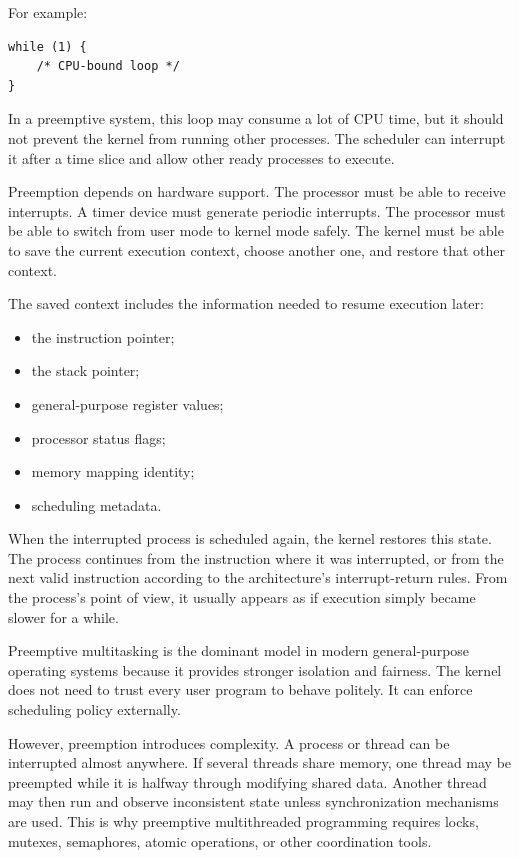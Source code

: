 For example:

\begin{verbatim}
while (1) {
    /* CPU-bound loop */
}
\end{verbatim}

In a preemptive system, this loop may consume a lot of CPU time, but it should not prevent the kernel from running other processes. The scheduler can interrupt it after a time slice and allow other ready processes to execute.

Preemption depends on hardware support. The processor must be able to receive interrupts. A timer device must generate periodic interrupts. The processor must be able to switch from user mode to kernel mode safely. The kernel must be able to save the current execution context, choose another one, and restore that other context.

The saved context includes the information needed to resume execution later:

\begin{itemize}
    \item the instruction pointer;
    \item the stack pointer;
    \item general-purpose register values;
    \item processor status flags;
    \item memory mapping identity;
    \item scheduling metadata.
\end{itemize}

When the interrupted process is scheduled again, the kernel restores this state. The process continues from the instruction where it was interrupted, or from the next valid instruction according to the architecture's interrupt-return rules. From the process's point of view, it usually appears as if execution simply became slower for a while.

Preemptive multitasking is the dominant model in modern general-purpose operating systems because it provides stronger isolation and fairness. The kernel does not need to trust every user program to behave politely. It can enforce scheduling policy externally.

However, preemption introduces complexity. A process or thread can be interrupted almost anywhere. If several threads share memory, one thread may be preempted while it is halfway through modifying shared data. Another thread may then run and observe inconsistent state unless synchronization mechanisms are used. This is why preemptive multithreaded programming requires locks, mutexes, semaphores, atomic operations, or other coordination tools.

